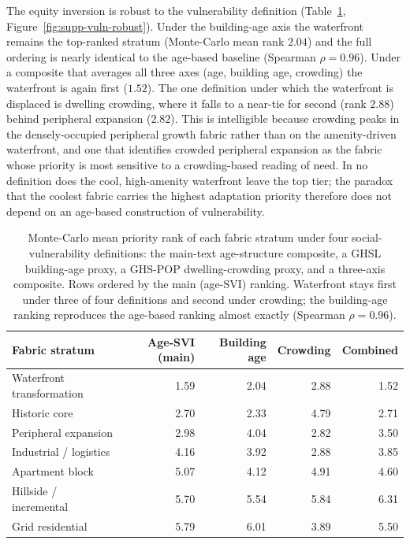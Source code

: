 The equity inversion is robust to the vulnerability definition (Table~\ref{tab:vuln-robust},
Figure~\ref{fig:supp-vuln-robust}). Under the building-age axis the waterfront remains the top-ranked stratum
(Monte-Carlo mean rank $2.04$) and the full ordering is nearly identical to the age-based baseline (Spearman
$\rho = 0.96$). Under a composite that averages all three axes (age, building age, crowding) the waterfront is again
first ($1.52$). The one definition under which the waterfront is displaced is dwelling crowding, where it falls to a
near-tie for second (rank $2.88$) behind peripheral expansion ($2.82$). This is intelligible because crowding
peaks in the densely-occupied peripheral growth fabric rather than on the amenity-driven waterfront, and one that
identifies crowded peripheral expansion as the fabric whose priority is most sensitive to a crowding-based reading
of need. In no definition does the cool, high-amenity waterfront leave the top tier; the paradox that the coolest
fabric carries the highest adaptation priority therefore does not depend on an age-based construction of
vulnerability.

\begin{table}[htbp]
  \centering\footnotesize
  \caption{Monte-Carlo mean priority rank of each fabric stratum under four social-vulnerability definitions:
  the main-text age-structure composite, a GHSL building-age proxy, a GHS-POP dwelling-crowding proxy, and a
  three-axis composite. Rows ordered by the main (age-SVI) ranking. Waterfront stays first under three of four
  definitions and second under crowding; the building-age ranking reproduces the age-based ranking almost exactly
  (Spearman $\rho = 0.96$).}
  \label{tab:vuln-robust}
  \begin{tabular}{@{}lrrrr@{}}
    \toprule
    Fabric stratum & Age-SVI (main) & Building age & Crowding & Combined \\
    \midrule
    Waterfront transformation & 1.59 & 2.04 & 2.88 & 1.52 \\
    Historic core             & 2.70 & 2.33 & 4.79 & 2.71 \\
    Peripheral expansion      & 2.98 & 4.04 & 2.82 & 3.50 \\
    Industrial / logistics    & 4.16 & 3.92 & 2.88 & 3.85 \\
    Apartment block           & 5.07 & 4.12 & 4.91 & 4.60 \\
    Hillside / incremental    & 5.70 & 5.54 & 5.84 & 6.31 \\
    Grid residential          & 5.79 & 6.01 & 3.89 & 5.50 \\
    \bottomrule
  \end{tabular}
\end{table}

